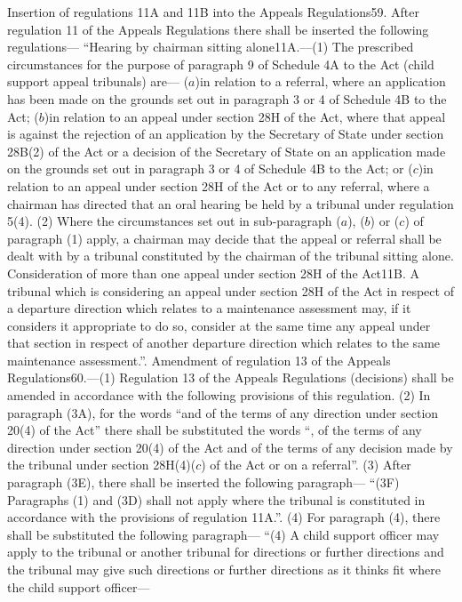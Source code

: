 \documentclass[a4paper]{article}
\begin{document}
Insertion of regulations 11A and 11B into the Appeals Regulations59. After
regulation 11 of the Appeals Regulations there shall be inserted the following
regulations—
“Hearing by chairman sitting alone11A.—(1) The prescribed circumstances for the
purpose of paragraph 9 of Schedule 4A to the Act (child support appeal
tribunals) are—
($a$)in relation to a referral, where an application has been made on the grounds
set out in paragraph 3 or 4 of Schedule 4B to the Act;
($b$)in relation to an appeal under section 28H of the Act, where that appeal is
against the rejection of an application by the Secretary of State under section
28B(2) of the Act or a decision of the Secretary of State on an application made
on the grounds set out in paragraph 3 or 4 of Schedule 4B to the Act; or
($c$)in relation to an appeal under section 28H of the Act or to any referral,
where a chairman has directed that an oral hearing be held by a tribunal under
regulation 5(4).
(2) Where the circumstances set out in sub-paragraph ($a$), ($b$) or ($c$) of
paragraph (1) apply, a chairman may decide that the appeal or referral shall be
dealt with by a tribunal constituted by the chairman of the tribunal sitting
alone.
Consideration of more than one appeal under section 28H of the Act11B. A
tribunal which is considering an appeal under section 28H of the Act in respect
of a departure direction which relates to a maintenance assessment may, if it
considers it appropriate to do so, consider at the same time any appeal under
that section in respect of another departure direction which relates to the same
maintenance assessment.”.
Amendment of regulation 13 of the Appeals Regulations60.—(1) Regulation 13 of
the Appeals Regulations (decisions) shall be amended in accordance with the
following provisions of this regulation.
(2) In paragraph (3A), for the words “and of the terms of any direction under
section 20(4) of the Act” there shall be substituted the words “, of the terms
of any direction under section 20(4) of the Act and of the terms of any decision
made by the tribunal under section 28H(4)($c$) of the Act or on a referral”.
(3) After paragraph (3E), there shall be inserted the following paragraph—
“(3F) Paragraphs (1) and (3D) shall not apply where the tribunal is constituted
in accordance with the provisions of regulation 11A.”.
(4) For paragraph (4), there shall be substituted the following paragraph—
“(4) A child support officer may apply to the tribunal or another tribunal for
directions or further directions and the tribunal may give such directions or
further directions as it thinks fit where the child support officer—
\end{document}
